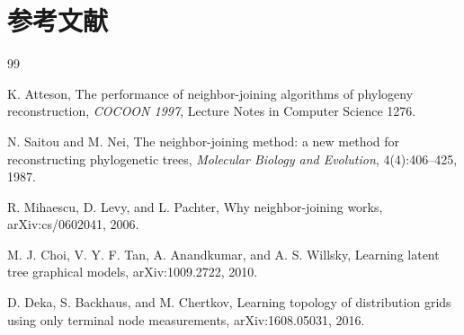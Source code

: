 \documentclass[UTF8,11pt]{ctexart}
\begin{document}
\section*{参考文献}

\begin{thebibliography}{99}

K. Atteson,
\newblock The performance of neighbor-joining algorithms of phylogeny reconstruction,
\newblock \emph{COCOON 1997}, Lecture Notes in Computer Science 1276.

N. Saitou and M. Nei,
\newblock The neighbor-joining method: a new method for reconstructing phylogenetic trees,
\newblock \emph{Molecular Biology and Evolution}, 4(4):406--425, 1987.

R. Mihaescu, D. Levy, and L. Pachter,
\newblock Why neighbor-joining works,
\newblock arXiv:cs/0602041, 2006.

M. J. Choi, V. Y. F. Tan, A. Anandkumar, and A. S. Willsky,
\newblock Learning latent tree graphical models,
\newblock arXiv:1009.2722, 2010.

D. Deka, S. Backhaus, and M. Chertkov,
\newblock Learning topology of distribution grids using only terminal node measurements,
\newblock arXiv:1608.05031, 2016.

\end{thebibliography}
\end{document}
